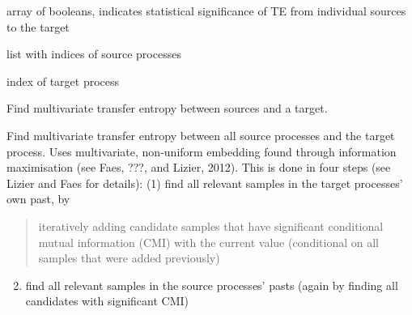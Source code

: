 \documentclass[letterpaper,10pt,english]{sphinxmanual}
\begin{document}
\begin{fulllineitems}
\begin{fulllineitems}
\end{fulllineitems}


\begin{fulllineitems}
\label{index:multivariate_te.Multivariate_te.sign_individual}
array of booleans, indicates statistical significance
of TE from individual sources to the target

\end{fulllineitems}


\begin{fulllineitems}
\label{index:multivariate_te.Multivariate_te.source_set}
list with indices of source processes

\end{fulllineitems}


\begin{fulllineitems}
\label{index:multivariate_te.Multivariate_te.target}
index of target process

\end{fulllineitems}


\begin{fulllineitems}
Find multivariate transfer entropy between sources and a target.

Find multivariate transfer entropy between all source processes and the
target process. Uses multivariate, non-uniform embedding found through
information maximisation (see Faes, ???, and Lizier, 2012). This is
done in four steps (see Lizier and Faes for details):
(1) find all relevant samples in the target processes' own past, by
\begin{quote}

iteratively adding candidate samples that have significant
conditional mutual information (CMI) with the current value
(conditional on all samples that were added previously)
\end{quote}
\begin{enumerate}
\setcounter{enumi}{1}
\item {} 
find all relevant samples in the source processes' pasts (again
by finding all candidates with significant CMI)


\end{enumerate}
\end{fulllineitems}
\end{fulllineitems}
\end{document}

